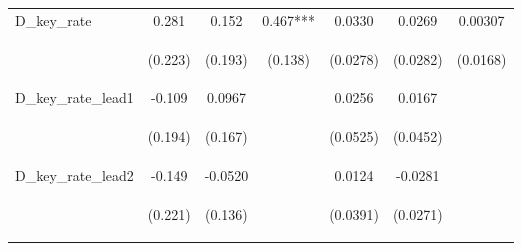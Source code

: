 \begin{tabular}{lcccccc}
D\_key\_rate & 0.281 & 0.152 & 0.467*** & 0.0330 & 0.0269 & 0.00307 \\
\vspace{4pt} & \begin{footnotesize}(0.223)\end{footnotesize} & \begin{footnotesize}(0.193)\end{footnotesize} & \begin{footnotesize}(0.138)\end{footnotesize} & \begin{footnotesize}(0.0278)\end{footnotesize} & \begin{footnotesize}(0.0282)\end{footnotesize} & \begin{footnotesize}(0.0168)\end{footnotesize} \\
D\_key\_rate\_lead1 & -0.109 & 0.0967 &  & 0.0256 & 0.0167 &  \\
\vspace{4pt} & \begin{footnotesize}(0.194)\end{footnotesize} & \begin{footnotesize}(0.167)\end{footnotesize} & \begin{footnotesize}\end{footnotesize} & \begin{footnotesize}(0.0525)\end{footnotesize} & \begin{footnotesize}(0.0452)\end{footnotesize} & \begin{footnotesize}\end{footnotesize} \\
D\_key\_rate\_lead2 & -0.149 & -0.0520 &  & 0.0124 & -0.0281 &  \\
\vspace{4pt} & \begin{footnotesize}(0.221)\end{footnotesize} & \begin{footnotesize}(0.136)\end{footnotesize} & \begin{footnotesize}\end{footnotesize} & \begin{footnotesize}(0.0391)\end{footnotesize} & \begin{footnotesize}(0.0271)\end{footnotesize} & \begin{footnotesize}\end{footnotesize} \\

\end{tabular}

